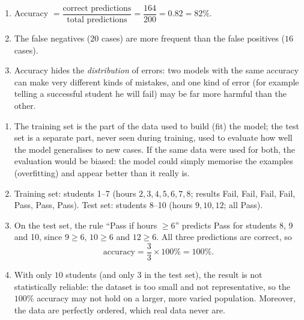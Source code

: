 \documentclass[11pt]{article}
\newcommand{\cle}[1]{{\popxbold\color{popdark}#1}}
\begin{document}
\begin{corrige}
\begin{enumerate}
\item Accuracy $= \dfrac{\text{correct predictions}}{\text{total predictions}} = \dfrac{164}{200} = 0.82 = 82\%$.
\item The false negatives ($20$ cases) are more frequent than the false positives ($16$ cases).
\item Accuracy hides the \emph{distribution} of errors: two models with the same accuracy can make very different kinds of mistakes, and one kind of error (for example telling a successful student he will fail) may be far more harmful than the other.
\end{enumerate}
\end{corrige}

\begin{corrige}
\begin{enumerate}
\item The \cle{training set} is the part of the data used to build (fit) the model; the \cle{test set} is a separate part, never seen during training, used to evaluate how well the model generalises to new cases. If the same data were used for both, the evaluation would be biased: the model could simply memorise the examples (overfitting) and appear better than it really is.
\item Training set: students 1--7 (hours $2, 3, 4, 5, 6, 7, 8$; results Fail, Fail, Fail, Fail, Pass, Pass, Pass). Test set: students 8--10 (hours $9, 10, 12$; all Pass).
\item On the test set, the rule ``Pass if hours $\geq 6$'' predicts Pass for students 8, 9 and 10, since $9 \geq 6$, $10 \geq 6$ and $12 \geq 6$. All three predictions are correct, so
\[ \text{accuracy} = \frac{3}{3} \times 100\% = 100\%. \]
\item With only $10$ students (and only $3$ in the test set), the result is not statistically reliable: the dataset is too small and not representative, so the $100\%$ accuracy may not hold on a larger, more varied population. Moreover, the data are perfectly ordered, which real data never are.
\end{enumerate}
\end{corrige}
\end{document}
